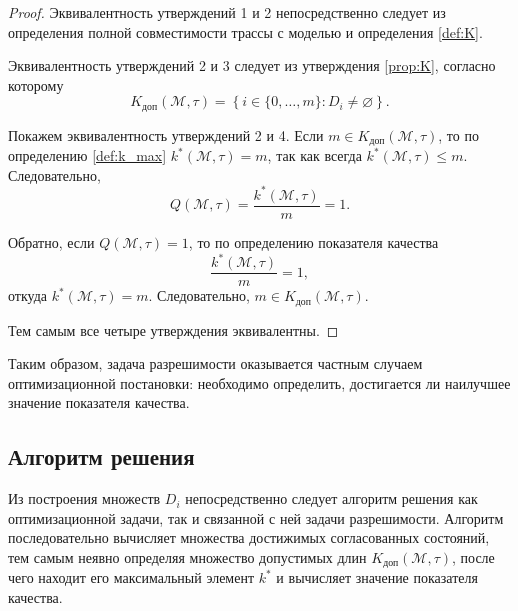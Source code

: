 \begin{proof}
Эквивалентность утверждений 1 и 2 непосредственно следует из определения полной
совместимости трассы с моделью и определения \ref{def:K}.

Эквивалентность утверждений 2 и 3 следует из утверждения \ref{prop:K}, согласно
которому
\[
K_{\mathrm{доп}}(\mathcal{M},\tau)
=
\left\{
i \in \{0,\dots,m\} : D_i \neq \varnothing
\right\}.
\]

Покажем эквивалентность утверждений 2 и 4. Если $m \in
K_{\mathrm{доп}}(\mathcal{M},\tau)$, то по определению \ref{def:k_max}
$k^*(\mathcal{M},\tau)=m$, так как всегда $k^*(\mathcal{M},\tau)\le m$.
Следовательно,
\[
Q(\mathcal{M},\tau)=\frac{k^*(\mathcal{M},\tau)}{m}=1.
\]

Обратно, если
$Q(\mathcal{M},\tau)=1$,
то по определению показателя качества
\[
\frac{k^*(\mathcal{M},\tau)}{m}=1,
\]
откуда $k^*(\mathcal{M},\tau)=m$. Следовательно, $m \in
K_{\mathrm{доп}}(\mathcal{M},\tau)$.

Тем самым все четыре утверждения эквивалентны.
\end{proof}

Таким образом, задача разрешимости оказывается частным случаем оптимизационной
постановки: необходимо определить, достигается ли наилучшее значение
показателя качества.

\subsection{Алгоритм решения}

Из построения множеств $D_i$ непосредственно следует алгоритм решения как
оптимизационной задачи, так и связанной с ней задачи разрешимости. Алгоритм
последовательно вычисляет множества достижимых согласованных состояний,
тем самым неявно определяя множество допустимых длин
$K_{\mathrm{доп}}(\mathcal{M},\tau)$, после чего находит его максимальный
элемент $k^*$ и вычисляет значение показателя качества.

